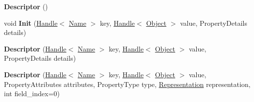 \begin{DoxyCompactItemize}
\item 
{\bfseries Descriptor} ()\hypertarget{classv8_1_1internal_1_1_b_a_s_e___e_m_b_e_d_d_e_d_acfc73acef29fd51fddd54f6ebf48c1b3}{}\label{classv8_1_1internal_1_1_b_a_s_e___e_m_b_e_d_d_e_d_acfc73acef29fd51fddd54f6ebf48c1b3}

\item 
void {\bfseries Init} (\hyperlink{classv8_1_1internal_1_1_handle}{Handle}$<$ \hyperlink{classv8_1_1internal_1_1_name}{Name} $>$ key, \hyperlink{classv8_1_1internal_1_1_handle}{Handle}$<$ \hyperlink{classv8_1_1internal_1_1_object}{Object} $>$ value, Property\+Details details)\hypertarget{classv8_1_1internal_1_1_b_a_s_e___e_m_b_e_d_d_e_d_a5134cb37e47c2840c17b29988f4e4ced}{}\label{classv8_1_1internal_1_1_b_a_s_e___e_m_b_e_d_d_e_d_a5134cb37e47c2840c17b29988f4e4ced}

\item 
{\bfseries Descriptor} (\hyperlink{classv8_1_1internal_1_1_handle}{Handle}$<$ \hyperlink{classv8_1_1internal_1_1_name}{Name} $>$ key, \hyperlink{classv8_1_1internal_1_1_handle}{Handle}$<$ \hyperlink{classv8_1_1internal_1_1_object}{Object} $>$ value, Property\+Details details)\hypertarget{classv8_1_1internal_1_1_b_a_s_e___e_m_b_e_d_d_e_d_a48acbbccbe70d3ae8c339023f2b64c29}{}\label{classv8_1_1internal_1_1_b_a_s_e___e_m_b_e_d_d_e_d_a48acbbccbe70d3ae8c339023f2b64c29}

\item 
{\bfseries Descriptor} (\hyperlink{classv8_1_1internal_1_1_handle}{Handle}$<$ \hyperlink{classv8_1_1internal_1_1_name}{Name} $>$ key, \hyperlink{classv8_1_1internal_1_1_handle}{Handle}$<$ \hyperlink{classv8_1_1internal_1_1_object}{Object} $>$ value, Property\+Attributes attributes, Property\+Type type, \hyperlink{classv8_1_1internal_1_1_representation}{Representation} representation, int field\+\_\+index=0)\hypertarget{classv8_1_1internal_1_1_b_a_s_e___e_m_b_e_d_d_e_d_a8d8dde8eed3b1afb3aa1bf10109ebccb}{}\label{classv8_1_1internal_1_1_b_a_s_e___e_m_b_e_d_d_e_d_a8d8dde8eed3b1afb3aa1bf10109ebccb}

\end{DoxyCompactItemize}
